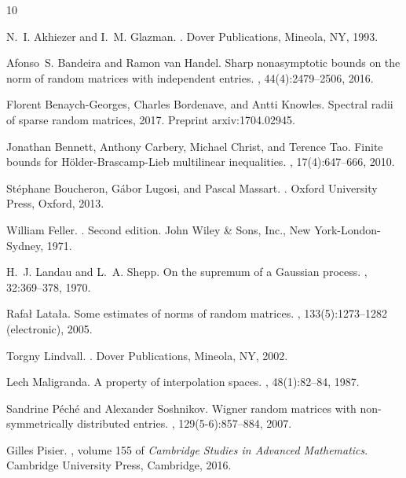 \documentclass[10pt,reqno]{amsart}
\theoremstyle{definition}
\numberwithin{equation}{section}
\numberwithin{figure}{section}
\numberwithin{table}{section}
\begin{document}
\begin{thebibliography}{10}

N.~I. Akhiezer and I.~M. Glazman.
.
\newblock Dover Publications, Mineola, NY, 1993.

Afonso~S. Bandeira and Ramon van Handel.
\newblock Sharp nonasymptotic bounds on the norm of random matrices with
  independent entries.
, 44(4):2479--2506, 2016.

Florent Benaych-Georges, Charles Bordenave, and Antti Knowles.
\newblock Spectral radii of sparse random matrices, 2017.
\newblock Preprint arxiv:1704.02945.

Jonathan Bennett, Anthony Carbery, Michael Christ, and Terence Tao.
\newblock Finite bounds for {H}\"older-{B}rascamp-{L}ieb multilinear
  inequalities.
, 17(4):647--666, 2010.

St\'ephane Boucheron, G\'abor Lugosi, and Pascal Massart.
.
\newblock Oxford University Press, Oxford, 2013.

William Feller.
.
\newblock Second edition. John Wiley \& Sons, Inc., New York-London-Sydney,
  1971.

H.~J. Landau and L.~A. Shepp.
\newblock On the supremum of a {G}aussian process.
, 32:369--378, 1970.

Rafa{\l} Lata{\l}a.
\newblock Some estimates of norms of random matrices.
, 133(5):1273--1282 (electronic), 2005.

Torgny Lindvall.
.
\newblock Dover Publications, Mineola, NY, 2002.

Lech Maligranda.
\newblock A property of interpolation spaces.
, 48(1):82--84, 1987.

Sandrine P\'ech\'e and Alexander Soshnikov.
\newblock Wigner random matrices with non-symmetrically distributed entries.
, 129(5-6):857--884, 2007.

Gilles Pisier.
, volume 155 of {\em Cambridge
  Studies in Advanced Mathematics}.
\newblock Cambridge University Press, Cambridge, 2016.


\end{thebibliography}
\end{document}
